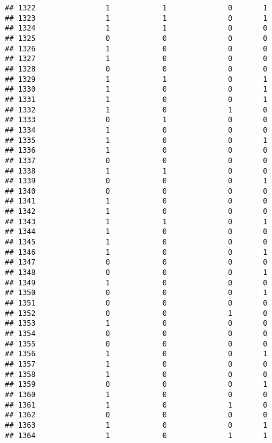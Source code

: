 \documentclass[]{article}
\begin{document}
\begin{verbatim}
## 1322                1            1              0       1
## 1323                1            1              0       1
## 1324                1            1              0       0
## 1325                0            0              0       0
## 1326                1            0              0       0
## 1327                1            0              0       0
## 1328                0            0              0       0
## 1329                1            1              0       1
## 1330                1            0              0       1
## 1331                1            0              0       1
## 1332                1            0              1       0
## 1333                0            1              0       0
## 1334                1            0              0       0
## 1335                1            0              0       1
## 1336                1            0              0       0
## 1337                0            0              0       0
## 1338                1            1              0       0
## 1339                0            0              0       1
## 1340                0            0              0       0
## 1341                1            0              0       0
## 1342                1            0              0       0
## 1343                1            1              0       1
## 1344                1            0              0       0
## 1345                1            0              0       0
## 1346                1            0              0       1
## 1347                0            0              0       0
## 1348                0            0              0       1
## 1349                1            0              0       0
## 1350                0            0              0       1
## 1351                0            0              0       0
## 1352                0            0              1       0
## 1353                1            0              0       0
## 1354                0            0              0       0
## 1355                0            0              0       0
## 1356                1            0              0       1
## 1357                1            0              0       0
## 1358                1            0              0       0
## 1359                0            0              0       1
## 1360                1            0              0       0
## 1361                1            0              1       0
## 1362                0            0              0       0
## 1363                1            0              0       1
## 1364                1            0              1       1

\end{verbatim}
\end{document}
